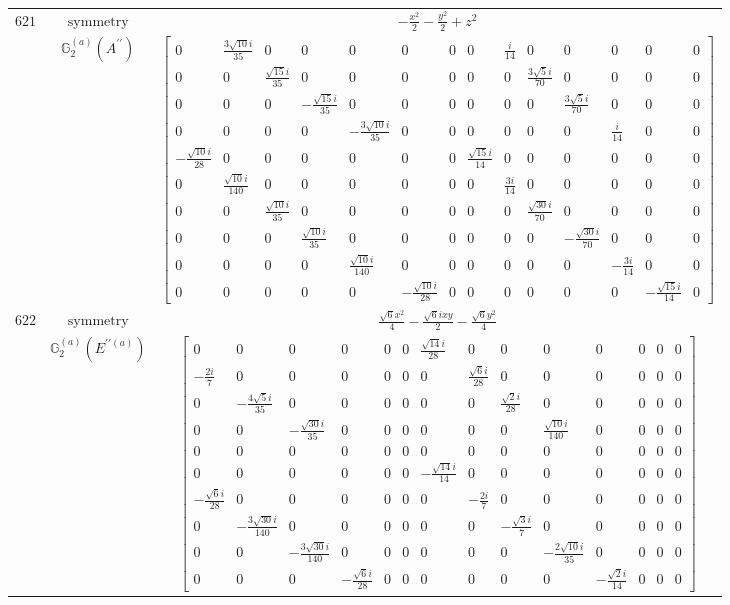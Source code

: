 \documentclass[fleqn,8pt,landscape]{jsarticle}
\begin{document}
\begin{longtable}{ccc}
$ 621 $ & $ \text{symmetry} $ & $ - \frac{x^{2}}{2} - \frac{y^{2}}{2} + z^{2} $ \\
$  $ & $ \mathbb{G}_{2}^{(a)}(A^{\prime\prime}) $ & $ \begin{bmatrix} 0 & \frac{3 \sqrt{10} i}{35} & 0 & 0 & 0 & 0 & 0 & 0 & \frac{i}{14} & 0 & 0 & 0 & 0 & 0 \\ 0 & 0 & \frac{\sqrt{15} i}{35} & 0 & 0 & 0 & 0 & 0 & 0 & \frac{3 \sqrt{5} i}{70} & 0 & 0 & 0 & 0 \\ 0 & 0 & 0 & - \frac{\sqrt{15} i}{35} & 0 & 0 & 0 & 0 & 0 & 0 & \frac{3 \sqrt{5} i}{70} & 0 & 0 & 0 \\ 0 & 0 & 0 & 0 & - \frac{3 \sqrt{10} i}{35} & 0 & 0 & 0 & 0 & 0 & 0 & \frac{i}{14} & 0 & 0 \\ - \frac{\sqrt{10} i}{28} & 0 & 0 & 0 & 0 & 0 & 0 & \frac{\sqrt{15} i}{14} & 0 & 0 & 0 & 0 & 0 & 0 \\ 0 & \frac{\sqrt{10} i}{140} & 0 & 0 & 0 & 0 & 0 & 0 & \frac{3 i}{14} & 0 & 0 & 0 & 0 & 0 \\ 0 & 0 & \frac{\sqrt{10} i}{35} & 0 & 0 & 0 & 0 & 0 & 0 & \frac{\sqrt{30} i}{70} & 0 & 0 & 0 & 0 \\ 0 & 0 & 0 & \frac{\sqrt{10} i}{35} & 0 & 0 & 0 & 0 & 0 & 0 & - \frac{\sqrt{30} i}{70} & 0 & 0 & 0 \\ 0 & 0 & 0 & 0 & \frac{\sqrt{10} i}{140} & 0 & 0 & 0 & 0 & 0 & 0 & - \frac{3 i}{14} & 0 & 0 \\ 0 & 0 & 0 & 0 & 0 & - \frac{\sqrt{10} i}{28} & 0 & 0 & 0 & 0 & 0 & 0 & - \frac{\sqrt{15} i}{14} & 0 \end{bmatrix} $ \\ \hline
$ 622 $ & $ \text{symmetry} $ & $ \frac{\sqrt{6} x^{2}}{4} - \frac{\sqrt{6} i x y}{2} - \frac{\sqrt{6} y^{2}}{4} $ \\
$  $ & $ \mathbb{G}_{2}^{(a)}(E^{\prime\prime(a)}) $ & $ \begin{bmatrix} 0 & 0 & 0 & 0 & 0 & 0 & \frac{\sqrt{14} i}{28} & 0 & 0 & 0 & 0 & 0 & 0 & 0 \\ - \frac{2 i}{7} & 0 & 0 & 0 & 0 & 0 & 0 & \frac{\sqrt{6} i}{28} & 0 & 0 & 0 & 0 & 0 & 0 \\ 0 & - \frac{4 \sqrt{5} i}{35} & 0 & 0 & 0 & 0 & 0 & 0 & \frac{\sqrt{2} i}{28} & 0 & 0 & 0 & 0 & 0 \\ 0 & 0 & - \frac{\sqrt{30} i}{35} & 0 & 0 & 0 & 0 & 0 & 0 & \frac{\sqrt{10} i}{140} & 0 & 0 & 0 & 0 \\ 0 & 0 & 0 & 0 & 0 & 0 & 0 & 0 & 0 & 0 & 0 & 0 & 0 & 0 \\ 0 & 0 & 0 & 0 & 0 & 0 & - \frac{\sqrt{14} i}{14} & 0 & 0 & 0 & 0 & 0 & 0 & 0 \\ - \frac{\sqrt{6} i}{28} & 0 & 0 & 0 & 0 & 0 & 0 & - \frac{2 i}{7} & 0 & 0 & 0 & 0 & 0 & 0 \\ 0 & - \frac{3 \sqrt{30} i}{140} & 0 & 0 & 0 & 0 & 0 & 0 & - \frac{\sqrt{3} i}{7} & 0 & 0 & 0 & 0 & 0 \\ 0 & 0 & - \frac{3 \sqrt{30} i}{140} & 0 & 0 & 0 & 0 & 0 & 0 & - \frac{2 \sqrt{10} i}{35} & 0 & 0 & 0 & 0 \\ 0 & 0 & 0 & - \frac{\sqrt{6} i}{28} & 0 & 0 & 0 & 0 & 0 & 0 & - \frac{\sqrt{2} i}{14} & 0 & 0 & 0 \end{bmatrix} $ \\ \hline

\end{longtable}
\end{document}
